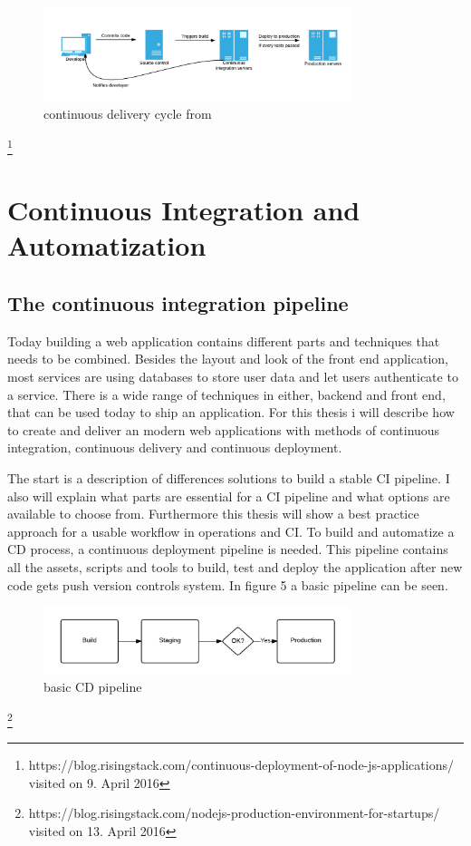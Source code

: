 \begin{figure}[h!]
  \centering
  \includegraphics[width=0.8\textwidth]{images/cd.png}
  \caption{continuous delivery cycle from}
\end{figure}
\footnote{https://blog.risingstack.com/continuous-deployment-of-node-js-applications/ visited on 9. April 2016}

\newpage

\section{Continuous Integration and Automatization}
\label{section:Continuous Integration and Automatization}

\subsection{The continuous integration pipeline}
Today building a web application contains different parts and techniques that needs to be combined. Besides the layout and look of the front end application,
most services are using databases to store user data and let users authenticate to a service. There is a wide range of techniques in either, backend and
front end, that can be used today to ship an application. For this thesis i will describe how to create and deliver an modern web
applications with methods of continuous integration, continuous delivery and continuous deployment.

The start is a description of differences solutions to build a stable CI pipeline. I also will explain what parts are essential for a CI pipeline and what options
are available to choose from. Furthermore this thesis will show a best practice approach for a usable workflow in operations and CI. To build and automatize a CD process,
a continuous deployment pipeline is needed. This pipeline contains all the assets, scripts and tools to build, test and deploy the application after new code gets
push version controls system. In figure 5 a basic pipeline can be seen.


\begin{figure}[h!]
  \centering
  \includegraphics[width=0.8\textwidth]{images/pipeline.png}
  \caption{basic CD pipeline}
\end{figure}
\footnote{https://blog.risingstack.com/nodejs-production-environment-for-startups/ visited on 13. April 2016}

